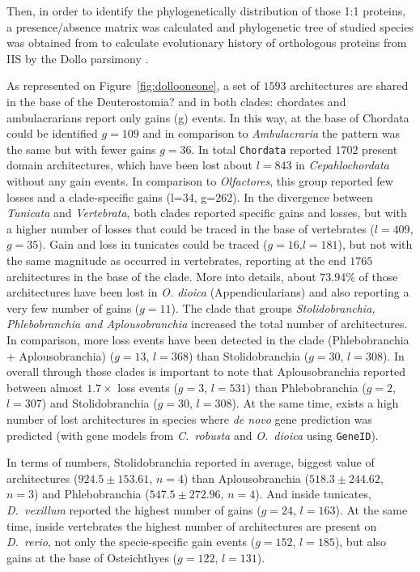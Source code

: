 \documentclass[11pt]{article}
\newcommand{\TODO}[1]{\begingroup\color{red}#1\endgroup}
\begin{document}

Then, in order to identify the phylogenetically distribution of those 1:1 
proteins, a presence/absence matrix was calculated and phylogenetic tree 
of studied species was obtained from \cite{} to calculate evolutionary history 
of orthologous proteins from IIS by the Dollo parsimony \cite{}.

As represented on Figure~\ref{fig:dollooneone}, a set of $1593$ architectures 
are shared in the base of the \TODO{Deuterostomia?} and in both clades: 
chordates and ambulacrarians report only gains (g) events. In this way, at the 
base of Chordata could be identified $g=109$ and in comparison to \textit{Ambulacraria}
the pattern was the same but with fewer gains $g=36$. In total \texttt{Chordata}
reported $1702$ present domain architectures, which have been lost about
$l=843$ in \textit{Cepahlochordata} without any gain events. In comparison
to \textit{Olfactores}, this group reported few losses and a clade-specific gains 
(l=$34$, g=$262$). In the divergence between \textit{Tunicata} and 
\textit{Vertebrata}, both clades reported specific gains and losses, but with a 
higher number of losses that could be traced in the base of vertebrates 
($l=409$, $g=35$). Gain and loss in tunicates could be traced ($g=16$,$l=181$), but not with
the same magnitude as occurred in vertebrates, reporting at the end $1765$ architectures in
the base of the clade. More into details, about $73.94$\% of those architectures 
have been lost in \textit{O. dioica} (Appendicularians) and also reporting a very 
few number of gains ($g=11$). \TODO{The clade that groups} \textsl{Stolidobranchia, 
Phlebobranchia and Aplousobranchia} increased the total number of architectures. 
In comparison, more loss events have been detected in the clade (Phlebobranchia +
Aplousobranchia) ($g=13$, $l=368$) than Stolidobranchia ($g=30$, $l=308$). In 
overall through those clades is important to note that Aplousobranchia reported 
between almost $1.7\times$ loss events ($g=3$, $l=531$) than Phlebobranchia ($g=2$, $l=307$) 
and Stolidobranchia ($g=30$, $l=308$). At the same time, exists a high number of lost 
architectures in species where \textit{de novo} gene prediction was predicted (with 
gene models from \textit{C.\ robusta} and \textit{O.\ dioica} using \texttt{GeneID}). 

In terms of numbers, Stolidobranchia reported in average, biggest value of 
architectures ($924.5 \pm 153.61$, $n=4$) than Aplousobranchia 
($518.3 \pm 244.62$, $n=3$) and Phlebobranchia ($547.5 \pm 272.96$, $n=4$).
And inside tunicates, \textit{D.\ vexillum} reported the highest number of
gains ($g=24$, $l=163$). At the same time, inside vertebrates the 
highest number of architectures are present on \textit{D.\ rerio}, 
not only the specie-specific gain events ($g=152$, $l=185$), but also 
gains at the base of Osteichthyes ($g=122$, $l=131$). 
\end{document}
